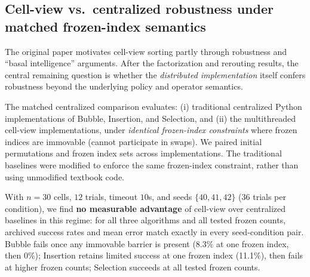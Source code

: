 \documentclass[11pt]{article}
\begin{document}
\subsection{Cell-view vs.\ centralized robustness under matched frozen-index semantics}
The original paper motivates cell-view sorting partly through robustness and ``basal intelligence''
arguments. After the factorization and rerouting results, the central remaining question is whether the
\emph{distributed implementation} itself confers robustness beyond the underlying policy and
operator semantics.

The matched centralized comparison evaluates:
(i) traditional centralized Python implementations of Bubble, Insertion, and Selection, and
(ii) the multithreaded cell-view implementations,
under \emph{identical frozen-index constraints} where frozen indices are immovable (cannot participate
in swaps). We paired initial permutations and frozen index sets across implementations.
The traditional baselines were modified to enforce the same frozen-index constraint, rather than
using unmodified textbook code.

With $n=30$ cells, $12$ trials, timeout $10$s, and seeds $\{40,41,42\}$ (36 trials per condition),
we find \textbf{no measurable advantage} of cell-view over centralized baselines in this regime:
for all three algorithms and all tested frozen counts, archived success rates and mean error match
exactly in every seed-condition pair.
Bubble fails once any immovable barrier is present (8.3\% at one frozen index, then 0\%);
Insertion retains limited success at one frozen index (11.1\%), then fails at higher frozen counts;
Selection succeeds at all tested frozen counts.
\end{document}
